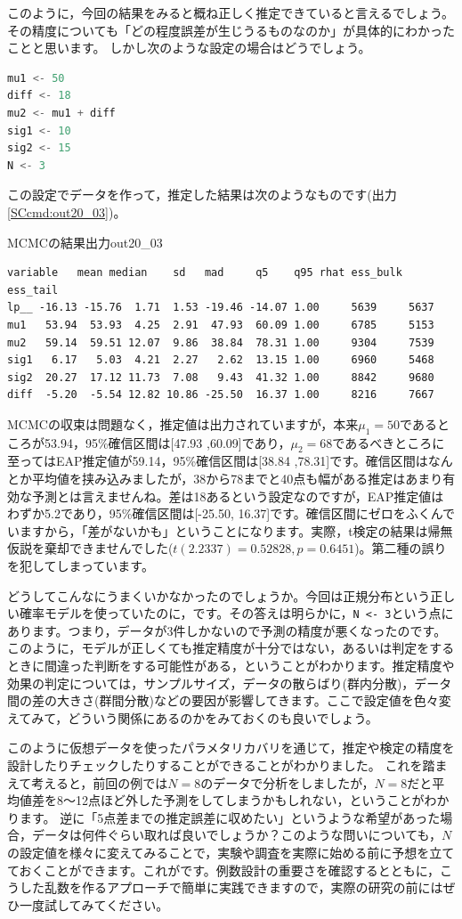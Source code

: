 \documentclass{ltjsbook}
\begin{document}
このように，今回の結果をみると概ね正しく推定できていると言えるでしょう。その精度についても「どの程度誤差が生じうるものなのか」が具体的にわかったことと思います。
しかし次のような設定の場合はどうでしょう。
\begin{lstlisting}[language=c++,label={code::20_04},caption={仮想データの生成その2}]
mu1 <- 50
diff <- 18
mu2 <- mu1 + diff
sig1 <- 10
sig2 <- 15
N <- 3
\end{lstlisting}
この設定でデータを作って，推定した結果は次のようなものです(出力\ref{SCcmd:out20_03})。
\begin{SCcmd}{MCMCの結果出力}{out20_03}
\begin{verbatim}
variable   mean median    sd   mad     q5    q95 rhat ess_bulk ess_tail
lp__ -16.13 -15.76  1.71  1.53 -19.46 -14.07 1.00     5639     5637
mu1   53.94  53.93  4.25  2.91  47.93  60.09 1.00     6785     5153
mu2   59.14  59.51 12.07  9.86  38.84  78.31 1.00     9304     7539
sig1   6.17   5.03  4.21  2.27   2.62  13.15 1.00     6960     5468
sig2  20.27  17.12 11.73  7.08   9.43  41.32 1.00     8842     9680
diff  -5.20  -5.54 12.82 10.86 -25.50  16.37 1.00     8216     7667
\end{verbatim}
\end{SCcmd}
MCMCの収束は問題なく，推定値は出力されていますが，本来$\mu_1=50$であるところが53.94，95\%確信区間は[47.93 ,60.09]であり，$\mu_2=68$であるべきところに至ってはEAP推定値が59.14，95\%確信区間は[38.84 ,78.31]です。確信区間はなんとか平均値を挟み込みましたが，38から78までと40点も幅がある推定はあまり有効な予測とは言えませんね。差は18あるという設定なのですが，EAP推定値はわずか5.2であり，95\%確信区間は[-25.50, 16.37]です。確信区間にゼロをふくんでいますから，「差がないかも」ということになります。実際，t検定の結果は帰無仮説を棄却できませんでした($t(2.2337)=0.52828,p=0.6451$)。第二種の誤りを犯してしまっています。

どうしてこんなにうまくいかなかったのでしょうか。今回は正規分布という正しい確率モデルを使っていたのに，です。その答えは明らかに，\verb|N <- 3|という点にあります。つまり，データが3件しかないので予測の精度が悪くなったのです。
このように，モデルが正しくても推定精度が十分ではない，あるいは判定をするときに間違った判断をする可能性がある，ということがわかります。推定精度や効果の判定については，サンプルサイズ，データの散らばり(群内分散)，データ間の差の大きさ(群間分散)などの要因が影響してきます。ここで設定値を色々変えてみて，どういう関係にあるのかをみておくのも良いでしょう。

このように仮想データを使ったパラメタリカバリを通じて，推定や検定の精度を設計したりチェックしたりすることができることがわかりました。
これを踏まえて考えると，前回の例では$N=8$のデータで分析をしましたが，$N=8$だと平均値差を8〜12点ほど外した予測をしてしまうかもしれない，ということがわかります。
逆に「5点差までの推定誤差に収めたい」というような希望があった場合，データは何件ぐらい取れば良いでしょうか？このような問いについても，$N$の設定値を様々に変えてみることで，実験や調査を実際に始める前に予想を立てておくことができます。これがです。例数設計の重要さを確認するとともに，こうした乱数を作るアプローチで簡単に実践できますので，実際の研究の前にはぜひ一度試してみてください。
\end{document}
